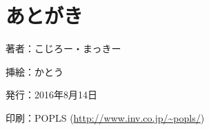 \documentclass[9pt,b5paper,tombo,openany]{jsbook}
\begin{document}
\chapter{あとがき}

\newpage

\thispagestyle{empty}
\begin{flushright}
	\begin{minipage}{0.5\hsize}
		\begin{description}
			\item{著者：}こじろー・まっきー
			\item{挿絵：}かとう
			\item{発行：}2016年8月14日
			\item{印刷：}POPLS (\url{http://www.inv.co.jp/~popls/})
		\end{description}
	\end{minipage}
\end{flushright}
\end{document}
